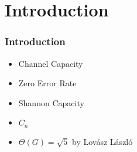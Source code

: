 \section{Introduction}

\begin{frame}
      \frametitle{Introduction}
      \begin{itemize}
            \item Channel Capacity
            \item Zero Error Rate
            \item Shannon Capacity
            \item $C_{n}$
            \item $\Theta(G) = \sqrt{5}$ by Lovász László
      \end{itemize}
\end{frame}